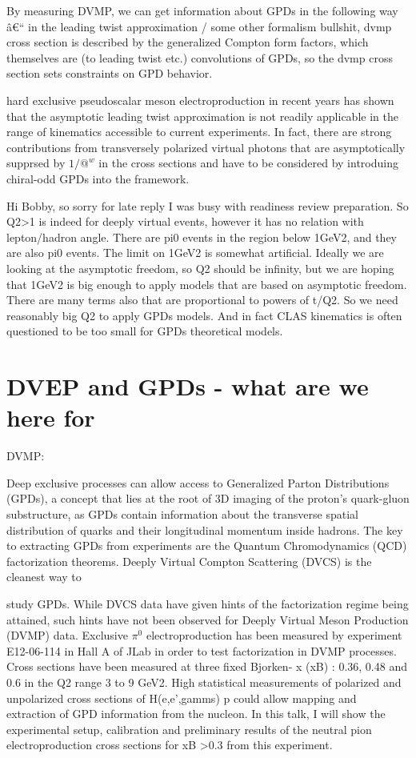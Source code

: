 By measuring DVMP, we can get information about GPDs in the following way â€“ in the leading twist approximation / some other formalism bullshit, dvmp cross section is described by the generalized Compton form factors, which themselves are (to leading twist etc.) convolutions of GPDs, so the dvmp cross section sets constraints on GPD behavior.

  hard exclusive pseudoscalar meson electroproduction in recent years has shown that the asymptotic leading twist approximation is not readily applicable in the range of kinematics accessible to current experiments. In fact, there are strong contributions from transversely polarized virtual photons that are asymptotically supprsed by $1/@^w$ in the cross sections and have to be considered by introduing chiral-odd GPDs into the framework.   



Hi Bobby, so sorry for late reply I was busy with readiness review preparation.
So Q2>1 is indeed for deeply virtual events, however it has no relation with lepton/hadron angle. There are pi0 events in the region below 1GeV2, and they are also pi0 events. The limit on 1GeV2 is somewhat artificial. Ideally we are looking at the asymptotic freedom, so Q2 should be infinity, but we are hoping that 1GeV2 is big enough to apply models that are based on asymptotic freedom. There are many terms also that are proportional to powers of t/Q2. So we need reasonably big Q2 to apply GPDs models. And in fact CLAS kinematics is often questioned to be too small for GPDs theoretical models.


\chapter{DVEP and GPDs - what are we here for}
    DVMP:

    Deep exclusive processes can allow access to Generalized Parton Distributions (GPDs), a concept that lies at the root of 3D imaging of the proton's quark-gluon substructure, as GPDs contain information about the transverse spatial distribution of quarks and their longitudinal momentum inside hadrons. The key to extracting GPDs from experiments are the Quantum Chromodynamics (QCD) factorization theorems. Deeply Virtual Compton Scattering (DVCS) is the cleanest way to
    
    study GPDs. While DVCS data have given hints of the factorization regime being attained, such hints have not been observed for Deeply Virtual Meson Production (DVMP) data. Exclusive $\pi^0$ electroproduction has been measured by experiment E12-06-114 in Hall A of JLab in order to test factorization in DVMP processes. Cross sections have been measured at three fixed Bjorken- x (xB) : 0.36, 0.48 and 0.6 in the Q2 range 3 to 9 GeV2. High statistical measurements of polarized and unpolarized cross sections of H(e,e',gamms) p could allow mapping and extraction of GPD information from the nucleon. In this talk, I will show the experimental setup, calibration and preliminary results of the neutral pion electroproduction cross sections for xB >0.3 from this experiment.  




